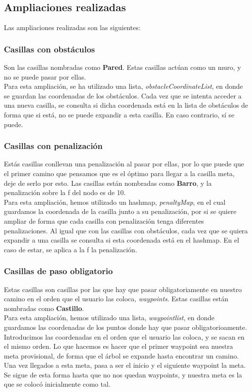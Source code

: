 \documentclass[12pt]{article}
\begin{document}
\subsection{Ampliaciones realizadas}
Las ampliaciones realizadas son las siguientes:
\subsubsection{Casillas con obstáculos}
Son las casillas nombradas como \textbf{Pared}. Estas casillas actúan como un muro, y no se puede pasar por ellas.\\
Para esta ampliación, se ha utilizado una lista, \textit{obstacleCoordinateList}, en donde se guardan las coordenadas de los obstáculos. Cada vez que se intenta acceder a una nueva casilla, se consulta si dicha coordenada está en la lista de obstáculos de forma que si está, no se puede expandir a esta casilla. En caso contrario, sí se puede.
\subsubsection{Casillas con penalización}
Estás casillas conllevan una penalización al pasar por ellas, por lo que puede que el primer camino que pensamos que es el óptimo para llegar a la casilla meta, deje de serlo por esto. Las casillas están nombradas como \textbf{Barro}, y la penalización sobre la f del nodo es de 10.\\
Para esta ampliación, hemos utilizado un hashmap, \textit{penaltyMap}, en el cual guardamos la coordenada de la casilla junto a su penalización, por si se quiere ampliar de forma que cada casilla con penalización tenga diferentes penalizaciones.
Al igual que con las casillas con obstáculos, cada vez que se quiera expandir a una casilla se consulta si esta coordenada está en el hashmap. En el caso de estar, se aplica a la f la penalización.
\subsubsection{Casillas de paso obligatorio}
Estas casillas son casillas por las que hay que pasar obligatoriamente en nuestro camino en el orden que el usuario las coloca, \textit{waypoints}. Estas casillas están nombradas como \textbf{Castillo}.\\
Para esta ampliación, hemos utilizado una lista, \textit{waypointlist}, en donde guardamos las coordenadas de los puntos donde hay que pasar obligatorioamente. Introducimos las coordenadas en el orden que el usuario las coloca, y se sacan en el mismo orden. Lo que hacemos es hacer que el primer waypoint sea nuestra meta provisional, de forma que el árbol se expande hasta encontrar un camino. Una vez llegados a esta meta, pasa a ser el inicio y el siguiente waypoint la meta. Se sigue de esta forma hasta que no nos quedan waypoints, y nuestra meta es la que se colocó inicialmente como tal.
\end{document}
